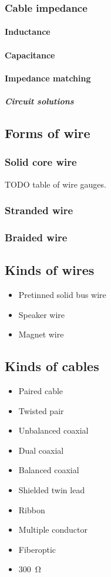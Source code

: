 \documentclass{report}
\begin{document}
\subsubsection{Cable impedance}
\paragraph{Inductance}
\paragraph{Capacitance}
\paragraph{Impedance matching}
\subparagraph{Circuit solutions}
\subsection{Forms of wire}
\subsubsection{Solid core wire}
TODO table of wire gauges.
\subsubsection{Stranded wire}
\subsubsection{Braided wire}
\subsection{Kinds of wires}
\begin{itemize}
\item Pretinned solid bus wire
\item Speaker wire
\item Magnet wire
\end{itemize}
\subsection{Kinds of cables}
\begin{itemize}
\item Paired cable
\item Twisted pair
\item Unbalanced coaxial
\item Dual coaxial
\item Balanced coaxial
\item Shielded twin lead
\item Ribbon
\item Multiple conductor
\item Fiberoptic
\item \SI{300}{\ohm}
\end{itemize}
\end{document}
